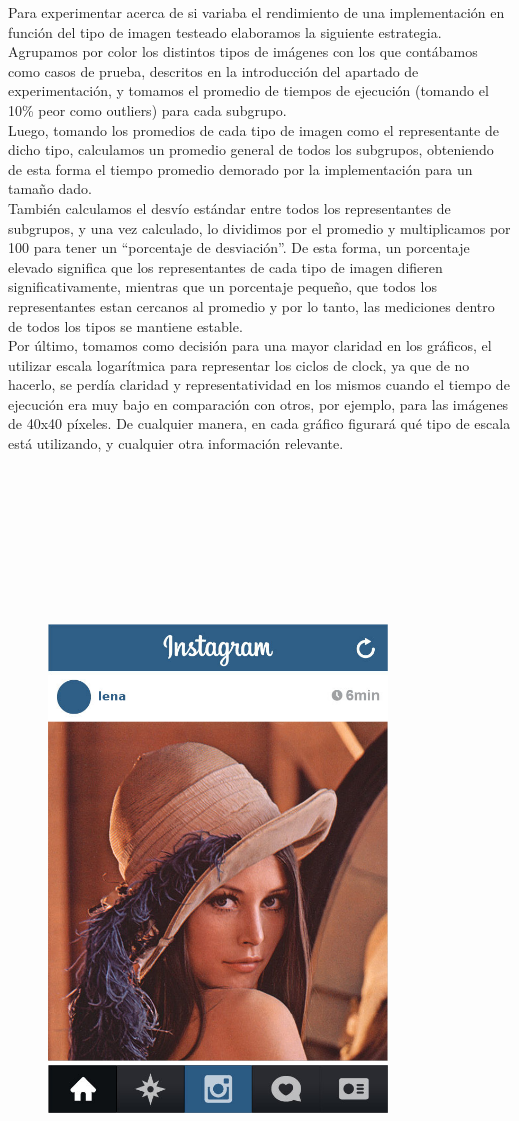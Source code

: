 Para experimentar acerca de si variaba el rendimiento de una implementación en función del tipo de imagen testeado elaboramos la siguiente estrategia. Agrupamos por color los distintos tipos de imágenes con los que contábamos como casos de prueba, descritos en la introducción del apartado de experimentación, y tomamos el promedio de tiempos de ejecución (tomando el 10\% peor como outliers) para cada subgrupo.\\ 
Luego, tomando los promedios de cada tipo de imagen como el representante de dicho tipo, calculamos un promedio general de todos los subgrupos, obteniendo de esta forma el tiempo promedio demorado por la implementación para un tamaño dado.\\
También calculamos el desvío estándar entre todos los representantes de subgrupos, y una vez calculado, lo dividimos por el promedio y multiplicamos por 100 para tener un “porcentaje de desviación”. De esta forma, un porcentaje elevado significa que los representantes de cada tipo de imagen difieren significativamente, mientras que un porcentaje pequeño, que todos los representantes estan cercanos al promedio y por lo tanto, las mediciones dentro de todos los tipos se mantiene estable.\\

Por último, tomamos como decisión para una mayor claridad en los gráficos, el utilizar escala logarítmica para representar los ciclos de clock, ya que de no hacerlo, se perdía claridad y representatividad en los mismos cuando el tiempo de ejecución era muy bajo en comparación con otros, por ejemplo, para las imágenes de 40x40 píxeles. De cualquier manera, en cada gráfico figurará qué tipo de escala está utilizando, y cualquier otra información relevante.\\\\\\\\\\\\\\\\\\

\begin{figure}[ht]
\centering
\includegraphics[width=90mm]{introduccion/lena_instagram.jpg}
\end{figure}
